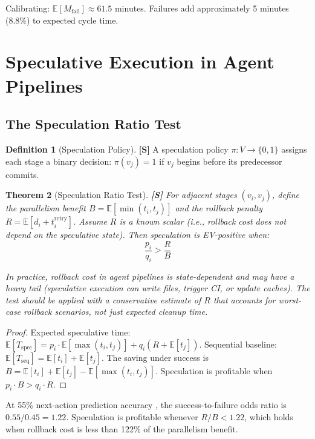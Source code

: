 \documentclass[11pt,a4paper]{article}
\newtheorem{theorem}{Theorem}[section]
\theoremstyle{definition}
\newtheorem{definition}[theorem]{Definition}
\theoremstyle{remark}
\newcommand{\E}{\mathbb{E}}
\begin{document}
Calibrating: $\E[M_{\mathrm{fail}}] \approx 61.5$ minutes. Failures add approximately 5 minutes (8.8\%) to expected cycle time.


\section{Speculative Execution in Agent Pipelines}\label{sec:speculation}

\subsection{The Speculation Ratio Test}

\begin{definition}[Speculation Policy]\label{def:spec}
\textbf{[S]} A speculation policy $\pi: V \to \{0,1\}$ assigns each stage a binary decision: $\pi(v_j) = 1$ if $v_j$ begins before its predecessor commits.
\end{definition}

\begin{theorem}[Speculation Ratio Test]\label{thm:spec-ratio}
\textbf{[S]} For adjacent stages $(v_i, v_j)$, define the parallelism benefit $B = \E[\min(t_i, t_j)]$ and the rollback penalty $R = \E[d_i + t_i^{\mathrm{retry}}]$. Assume $R$ is a known scalar (i.e., rollback cost does not depend on the speculative state). Then speculation is EV-positive when:
\[
    \frac{p_i}{q_i} > \frac{R}{B}
\]

In practice, rollback cost in agent pipelines is state-dependent and may have a heavy tail (speculative execution can write files, trigger CI, or update caches). The test should be applied with a conservative estimate of $R$ that accounts for worst-case rollback scenarios, not just expected cleanup time.
\end{theorem}

\begin{proof}
Expected speculative time: $\E[T_{\mathrm{spec}}] = p_i \cdot \E[\max(t_i, t_j)] + q_i(R + \E[t_j])$. Sequential baseline: $\E[T_{\mathrm{seq}}] = \E[t_i] + \E[t_j]$. The saving under success is $B = \E[t_i] + \E[t_j] - \E[\max(t_i, t_j)]$. Speculation is profitable when $p_i \cdot B > q_i \cdot R$.
\end{proof}

At 55\% next-action prediction accuracy \citep{zhou2025speculative}, the success-to-failure odds ratio is $0.55/0.45 = 1.22$. Speculation is profitable whenever $R/B < 1.22$, which holds when rollback cost is less than 122\% of the parallelism benefit.
\end{document}
